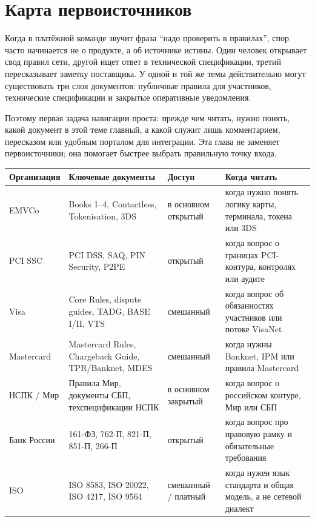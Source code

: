 
\chapter{Карта первоисточников}
\label{ch:primary-sources}
Когда в платёжной команде звучит фраза \enquote{надо проверить
в правилах}, спор часто начинается не о продукте, а об источнике
истины. Один человек открывает свод правил сети, другой ищет ответ
в технической спецификации, третий пересказывает заметку поставщика.
У одной и той же темы действительно могут существовать три слоя
документов: публичные правила для участников, технические
спецификации и закрытые оперативные уведомления.

Поэтому первая задача навигации проста: прежде чем читать, нужно
понять, какой документ в этой теме главный, а какой служит лишь
комментарием, пересказом или удобным порталом для интеграции. Эта глава
не заменяет первоисточники; она помогает быстрее выбрать
правильную точку входа.

\begin{table}[h]
  \centering
  \scriptsize
  \renewcommand{\arraystretch}{1.15}
  \begin{tabular}{|p{1.8cm}|p{3.3cm}|p{2.0cm}|p{3.0cm}|}
    \hline
    \textbf{Организация} & \textbf{Ключевые документы}
    & \textbf{Доступ}     & \textbf{Когда читать}
    \\
    \hline
    EMVCo                & Books 1--4, Contactless, Tokenisation, 3DS
    & в основном открытый & когда нужно понять логику карты,
    терминала, токена или 3DS      \\
    \hline
    PCI SSC              & PCI DSS, SAQ, PIN Security, P2PE
    & открытый            & когда вопрос о границах PCI-контура,
    контролях или аудите       \\
    \hline
    Visa                 & Core Rules, dispute guides, TADG, BASE
    I/II, VTS      & смешанный           & когда вопрос об
    обязанностях участников или потоке VisaNet      \\
    \hline
    Mastercard           & Mastercard Rules, Chargeback Guide,
    TPR/Banknet, MDES & смешанный           & когда нужны Banknet,
    IPM или правила Mastercard                 \\
    \hline
    НСПК / Мир           & Правила Мир, документы СБП,
    техспецификации НСПК      & в основном закрытый & когда вопрос о
    российском контуре, Мир или СБП                  \\
    \hline
    Банк России          & 161-ФЗ, 762-П, 821-П, 851-П, 266-П
    & открытый            & когда вопрос про правовую рамку и
    обязательные требования       \\
    \hline
    ISO                  & ISO 8583, ISO 20022, ISO 4217, ISO 9564
    & смешанный / платный & когда нужен язык стандарта и общая
    модель, а не сетевой диалект \\
    \hline
  \end{tabular}
\end{table}

